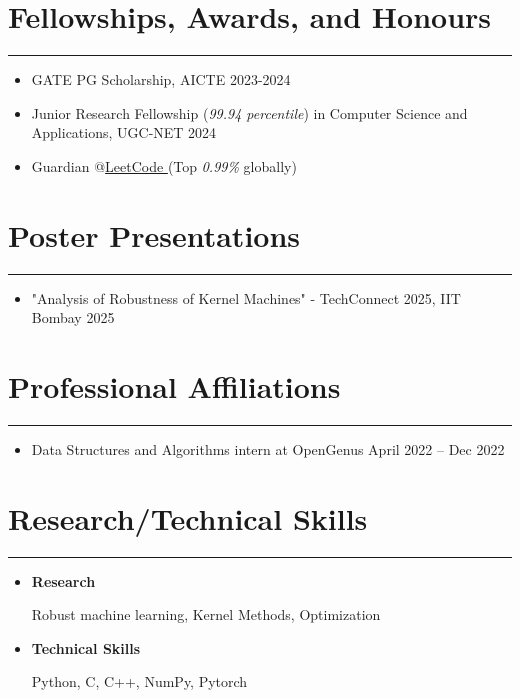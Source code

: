 \documentclass{article}
\begin{document}
\section*{Fellowships, Awards, and Honours}
\hrule
\vspace{1em}

\begin{itemize}[leftmargin=*]
    \item[] GATE PG Scholarship, AICTE \hfill 2023-2024
    \item[] Junior Research Fellowship (\textit{99.94 percentile}) in Computer Science and Applications, UGC-NET \hfill 2024
    \item [] Guardian @\href{https://leetcode.com/u/user0434y/}{LeetCode }(Top \textit{0.99\%} globally)
\end{itemize}

\section*{Poster Presentations}
\hrule
\vspace{1em}
\begin{itemize}[leftmargin=*]
    \item[] "Analysis of Robustness of Kernel Machines" - TechConnect 2025, IIT Bombay \hfill 2025
\end{itemize}

\section*{Professional Affiliations}
\hrule
\vspace{1em}

\begin{itemize}[leftmargin=*]
    \item[] Data Structures and Algorithms intern at OpenGenus  \hfill April 2022 -- Dec 2022
\end{itemize}


\section*{Research/Technical Skills}
\hrule
\vspace{1em}

\begin{itemize}[leftmargin=*]
    \item[] \textbf{Research} 
        \begin{itemize}
        Robust machine learning, Kernel Methods, Optimization
        \end{itemize}
    \item[] \textbf{Technical Skills}
        \begin{itemize}
        Python, C, C++, NumPy, Pytorch
        \end{itemize}
\end{itemize}
\end{document}

